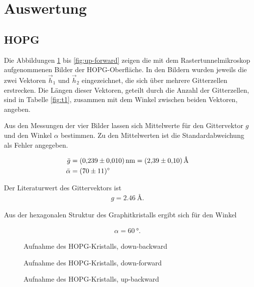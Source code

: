 \section{Auswertung}
\subsection{HOPG}

Die Abbildungen \ref{fig:down-backward} bis \ref{fig:up-forward} zeigen die mit dem Rastertunnelmikroskop aufgenommenen Bilder der HOPG-Oberfläche.
In den Bildern wurden jeweils die zwei Vektoren $\vec{h}_1$ und $\vec{h}_2$ eingezeichnet, die sich über mehrere Gitterzellen erstrecken.
Die Längen dieser Vektoren, geteilt durch die Anzahl der Gitterzellen, sind in Tabelle \ref{fig:t1}, zusammen mit dem Winkel zwischen beiden Vektoren, angeben.

Aus den Messungen der vier Bilder lassen sich Mittelwerte für den Gittervektor $g$ und den Winkel $\alpha$ bestimmen.
Zu den Mittelwerten ist die Standardabweichung als Fehler angegeben.

\begin{align}
	\bar{g} &= \SI{0,239 \pm 0,01}{\nano \meter} = \SI{2,39 \pm 0,1}{\angstrom}\\
	\bar{\alpha} &= \SI{70 \pm 11}{\degree}
\end{align}

Der Literaturwert\cite{hopg} des Gittervektors ist
\begin{align}
	g = \SI{2.46}{\angstrom}.
\end{align}

Aus der hexagonalen Struktur des Graphitkristalls ergibt sich für den Winkel

\begin{align}
	\alpha = \SI{60}{\degree}.
\end{align}

\begin{figure}
	\centering
	\resizebox{12cm}{!}{
		
	}
	\caption{Aufnahme des HOPG-Kristalls, down-backward}
	\label{fig:down-backward}
\end{figure}

\begin{figure}
	\centering
	\resizebox{12cm}{!}{
		
	}
	\caption{Aufnahme des HOPG-Kristalls, down-forward}
	\label{fig:down-forward}
\end{figure}

\begin{figure}
	\centering
	\resizebox{12cm}{!}{
		
	}
	\caption{Aufnahme des HOPG-Kristalls, up-backward}
	\label{fig:up-backward}
\end{figure}

